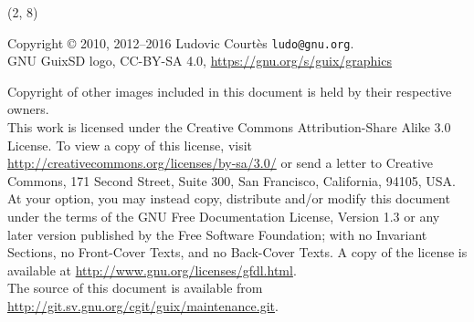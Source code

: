 \documentclass{beamer}
\begin{document}
\begin{frame}{}

  \begin{textblock}{12}(2, 8)
    \tiny{
      Copyright \copyright{} 2010, 2012--2016 Ludovic Courtès \texttt{ludo@gnu.org}.\\[3.0mm]
      GNU GuixSD logo, CC-BY-SA 4.0, \url{https://gnu.org/s/guix/graphics}

      Copyright of other images included in this document is held by
      their respective owners.
      \\[3.0mm]
      This work is licensed under the \alert{Creative Commons
        Attribution-Share Alike 3.0} License.  To view a copy of this
      license, visit
      \url{http://creativecommons.org/licenses/by-sa/3.0/} or send a
      letter to Creative Commons, 171 Second Street, Suite 300, San
      Francisco, California, 94105, USA.
      \\[2.0mm]
      At your option, you may instead copy, distribute and/or modify
      this document under the terms of the \alert{GNU Free Documentation
        License, Version 1.3 or any later version} published by the Free
      Software Foundation; with no Invariant Sections, no Front-Cover
      Texts, and no Back-Cover Texts.  A copy of the license is
      available at \url{http://www.gnu.org/licenses/gfdl.html}.
      \\[2.0mm]
      The source of this document is available from
      \url{http://git.sv.gnu.org/cgit/guix/maintenance.git}.
    }
  \end{textblock}
\end{frame}
\end{document}
